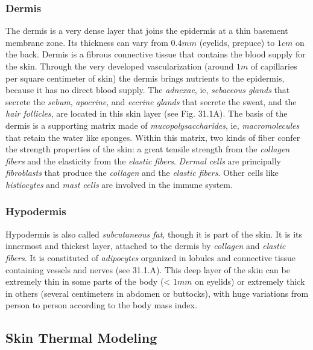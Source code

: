 \subsubsection*{Dermis}

The dermis is a very dense layer that joins the epidermis at a thin basement membrane
zone. Its thickness can vary from $0.4 mm$ (eyelids, prepuce) to $1 cm$ on the back.
Dermis is a fibrous connective tissue that contains the blood supply for the skin.
Through the very developed vascularization (around $1 m$ of capillaries per square
centimeter of skin) the dermis brings nutrients to the epidermis, because it has no
direct blood supply. The \textit{adnexae}, ie, \textit{sebaceous glands} that secrete the
\textit{sebum}, \textit{apocrine}, and \textit{eccrine glands} that secrete the sweat,
and the \textit{hair follicles}, are located in this skin layer (see Fig. 31.1A). The
basis of the dermis is a supporting matrix made of \textit{mucopolysaccharides}, ie,
\textit{macromolecules} that retain the water like sponges. Within this matrix, two
kinds of fiber confer the strength properties of the skin: a great tensile strength
from the \textit{collagen fibers} and the elasticity from the \textit{elastic fibers}.
\textit{Dermal cells} are principally \textit{fibroblasts} that produce the
\textit{collagen} and the \textit{elastic fibers}. Other cells like \textit{histiocytes}
and \textit{mast cells} are involved in the immune system.

\subsubsection*{Hypodermis}

Hypodermis is also called \textit{subcutaneous fat}, though it is part of the skin.
It is its innermost and thickest layer, attached to the dermis by \textit{collagen}
and \textit{elastic fibers}. It is constituted of \textit{adipocytes} organized in
lobules and connective tissue containing vessels and nerves (see 31.1.A). This deep
layer of the skin can be extremely thin in some parts of the body (< $1 mm$ on eyelids)
or extremely thick in others (several centimeters in abdomen or buttocks), with huge
variations from person to person according to the body mass index.

\subsection*{Skin Thermal Modeling}

